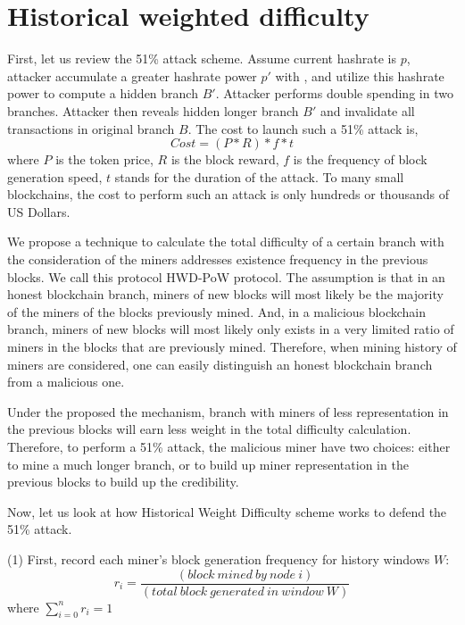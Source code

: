 \documentclass[conference]{IEEEtran}
\begin{document}
\section{Historical weighted difficulty}
First, let us review the 51\% attack scheme. Assume current hashrate is $p$, attacker accumulate a greater hashrate power $p'$ with , and utilize this hashrate power to compute a hidden branch $B'$. Attacker performs double spending in two branches. Attacker then reveals hidden longer branch $B'$ and invalidate all transactions in original branch $B$. The cost to launch such a 51\% attack is,
\begin{equation}
Cost=(P*R)*f*t\label{eq}
\end{equation}
where $P$ is the token price, $R$ is the block reward, $f$ is the frequency of block generation speed, $t$ stands for the duration of the attack.
To many small blockchains, the cost to perform such an attack is only hundreds or thousands of US Dollars.

We propose a technique to calculate the total difficulty of a certain branch with the consideration of the miners addresses existence frequency in the previous blocks. We call this protocol HWD-PoW protocol. The assumption is that in an honest blockchain branch, miners of new blocks will most likely be the majority of the miners of the blocks previously mined. And, in a malicious blockchain branch, miners of new blocks will most likely only exists in a very limited ratio of miners in the blocks that are previously mined. Therefore, when mining history of miners are considered, one can easily distinguish an honest blockchain branch from a malicious one.

Under the proposed the mechanism, branch with miners of less representation in the previous blocks will earn less weight in the total difficulty calculation. Therefore, to perform a 51\% attack, the malicious miner have two choices: either to mine a much longer branch, or to build up miner representation in the previous blocks to build up the credibility.

Now, let us look at how Historical Weight Difficulty scheme works to defend the 51\% attack. 

(1) First, record each miner’s block generation frequency for history windows $W$:
\begin{equation}
r_i=\frac{(block\ mined\ by\ node\ i)}{(total\ block\ generated\ in\ window\ W)}\label{eq}
\end{equation}
where $\sum_{i=0}^{n}r_i = 1$
\end{document}
